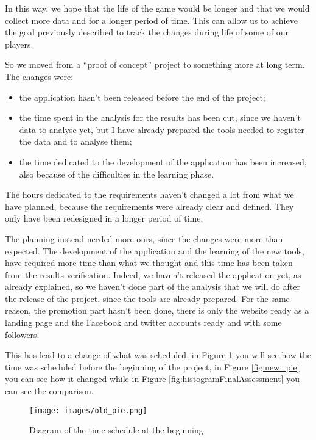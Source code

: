 In this way, we hope that the life of the game would be longer and that we would collect more data and for a longer period of time. This can allow us to achieve the goal previously described to track the changes during life of some of our players.

So we moved from a ``proof of concept'' project to something more at long term. The changes were:
\begin{itemize}
\item the application hasn't been released before the end of the project;
\item the time spent in the analysis for the results has been cut, since we haven't data to analyse yet, but I have already prepared the tools needed to register the data and to analyse them;
\item the time dedicated to the development of the application has been increased, also because of the difficulties in the learning phase.
\end{itemize}

The hours dedicated to the requirements haven't changed a lot from what we have planned, because the requirements were already clear and defined. They only have been redesigned in a longer period of time.

The planning instead needed more ours, since the changes were more than expected. The development of the application and the learning of the new tools, have required more time than what we thought and this time has been taken from the results verification. Indeed, we haven't released the application yet, as already explained, so we haven't done part of the analysis that we will do after the release of the project, since the tools are already prepared. For the same reason, the promotion part hasn't been done, there is only the website ready as a landing page and the Facebook and twitter accounts ready and with some followers.

This has lead to a change of what was scheduled. in Figure \ref{fig:old_pie} you will see how the time was scheduled before the beginning of the project, in Figure \ref{fig:new_pie} you can see how it changed while in Figure \ref{fig:histogramFinalAssessment} you can see the comparison.

\begin{figure}[H]
\centering %
\texttt{[image: images/old\_pie.png]}
\caption{Diagram of the time schedule at the beginning}
\label{fig:old_pie}
\end{figure}

